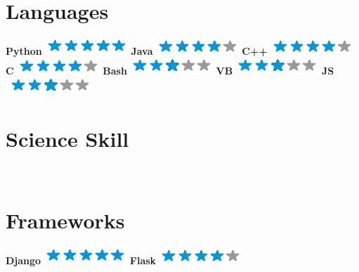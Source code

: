 \begin{aside}
	~
	~
	~
	~
	~
	~
	~
	~
	~
	~
	~
    \section{Languages}
    \textbf{Python}\includegraphics[scale=0.40]{img/5stars.png}
    \textbf{Java}\includegraphics[scale=0.40]{img/4stars.png}
    \textbf{C++}\includegraphics[scale=0.40]{img/4stars.png}
    \textbf{C}\includegraphics[scale=0.40]{img/4stars.png}
    \textbf{Bash}\includegraphics[scale=0.40]{img/3stars.png}
    \textbf{VB}\includegraphics[scale=0.40]{img/3stars.png}
    \textbf{JS}\includegraphics[scale=0.40]{img/3stars.png}
    ~
	~
	~
	~
	~
	~
	~
	~
	~
	~
	~
    \section{Science Skill}
    ~
    ~
    ~
    \section{Frameworks}
    \textbf{Django}\includegraphics[scale=0.40]{img/5stars.png}
    \textbf{Flask}\includegraphics[scale=0.40]{img/4stars.png}
\end{aside}
